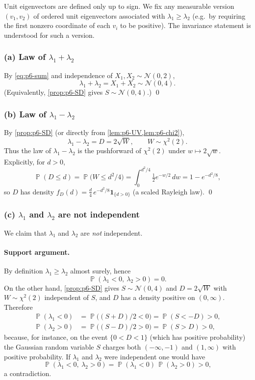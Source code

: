 \documentclass[11pt,a4paper]{article}
\DeclareMathOperator{\Pbb}{\mathbb{P}}
\begin{document}
\begin{remark*}
Unit eigenvectors are defined only up to sign. We fix any measurable version \((v_1,v_2)\) of ordered unit eigenvectors associated with \(\lambda_1\ge\lambda_2\) (e.g.\ by requiring the first nonzero coordinate of each \(v_i\) to be positive). The invariance statement is understood for such a version.
\end{remark*}

\subsubsection{(a) Law of \(\lambda_1+\lambda_2\)}

By \eqref{eq:p6-sum} and independence of \(X_1,X_2\sim\mathcal{N}(0,2)\),
\[
\lambda_1+\lambda_2
=
X_1+X_2
\sim
\mathcal{N}(0,4).
\]
(Equivalently, \cref{prop:p6-SD} gives \(S\sim\mathcal{N}(0,4)\).)
\qed

\subsubsection{(b) Law of \(\lambda_1-\lambda_2\)}

By \cref{prop:p6-SD} (or directly from \cref{lem:p6-UV,lem:p6-chi2}),
\[
\lambda_1-\lambda_2
=
D
=
2\sqrt{W},
\qquad
W\sim\chi^2(2).
\]
Thus the law of \(\lambda_1-\lambda_2\) is the pushforward of \(\chi^2(2)\) under \(w\mapsto 2\sqrt{w}\). Explicitly, for \(d>0\),
\[
\Pbb(D\le d)
=
\Pbb\bigl(W\le d^2/4\bigr)
=
\int_0^{d^2/4}\tfrac12 e^{-w/2}\,dw
=
1-e^{-d^2/8},
\]
so \(D\) has density \(f_D(d)=\frac{d}{4}\,e^{-d^2/8}\mathbf{1}_{\{d>0\}}\) (a scaled Rayleigh law).
\qed

\subsubsection{(c) \(\lambda_1\) and \(\lambda_2\) are not independent}

We claim that \(\lambda_1\) and \(\lambda_2\) are \emph{not} independent.

\paragraph{Support argument.}
By definition \(\lambda_1\ge\lambda_2\) almost surely, hence
\[
\Pbb(\lambda_1<0,\ \lambda_2>0)
=
0.
\]
On the other hand, \cref{prop:p6-SD} gives \(S\sim\mathcal{N}(0,4)\) and \(D=2\sqrt{W}\) with \(W\sim\chi^2(2)\) independent of \(S\), and \(D\) has a density positive on \((0,\infty)\). Therefore
\begin{align*}
\Pbb(\lambda_1<0)
&=
\Pbb\bigl((S+D)/2<0\bigr)
=
\Pbb(S<-D)
>
0,
\\
\Pbb(\lambda_2>0)
&=
\Pbb\bigl((S-D)/2>0\bigr)
=
\Pbb(S>D)
>
0,
\end{align*}
because, for instance, on the event \(\{0<D<1\}\) (which has positive probability) the Gaussian random variable \(S\) charges both \((-\infty,-1)\) and \((1,\infty)\) with positive probability. If \(\lambda_1\) and \(\lambda_2\) were independent one would have
\[
\Pbb(\lambda_1<0,\ \lambda_2>0)
=
\Pbb(\lambda_1<0)\,\Pbb(\lambda_2>0)
>
0,
\]
a contradiction.
\end{document}
